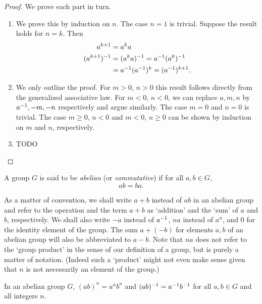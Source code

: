 \begin{proof}
    We prove each part in turn.
    \begin{enumerate}[label=(\alph*), wide]
        \item We prove this by induction on \(n\). The case \(n = 1\) is
        trivial. Suppose the result holds for \(n = k\). Then
        \begin{align*}
            a^{k + 1} & = a^k a\\
            (a^{k + 1})^{-1} & = (a^k a)^{-1} = a^{-1} (a^k)^{-1}\\
            & = a^{-1} (a^{-1})^k = (a^{-1})^{k + 1}.
        \end{align*}
        \item We only outline the proof. For \(m > 0\), \(n > 0\) this result
        follows directly from the generalized associative law. For \(m < 0\),
        \(n < 0\), we can replace \(a, m, n\) by \(a^{-1}, -m, -n\) respectively
        and argue similarly. The case \(m = 0\) and \(n = 0\) is trivial. The
        case \(m \geq 0\), \(n < 0\) and \(m < 0\), \(n \geq 0\) can be shown by
        induction on \(m\) and \(n\), respectively.
        
        \item TODO

    \end{enumerate}
\end{proof}


\begin{definition}
    A group \(G\) is said to be \emph{abelian} (or \emph{commutative}) if for
    all \(a, b \in G\),
    \[
        ab = ba.
    \]
\end{definition}

As a matter of convention, we shall write \(a + b\) instead of \(ab\) in an
abelian group and refer to the operation and the term \(a + b\) as `addition'
and the `sum' of \(a\) and \(b\), respectively. We shall also write \(-a\)
instead of \(a^{-1}\), \(na\) instead of \(a^n\), and \(0\) for the identity
element of the group. The sum \(a + (-b)\) for elements \(a, b\) of an abelian
group will also be abbreviated to \(a - b\). Note that \(na\) does not refer to
the `group product' in the sense of our definition of a group, but is purely a
matter of notation. (Indeed such a `product' might not even make sense given
that \(n\) is not necessarily an element of the group.)

\begin{theorem}
    In an abelian group \(G\), \((ab)^n = a^n b^n\) and \((ab)^{-1} = a^{-1}
    b^{-1}\) for all \(a, b \in G\) and all integers \(n\).
\end{theorem}

